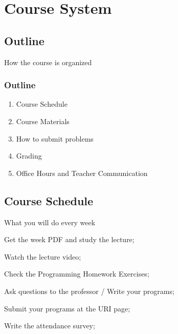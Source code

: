 
\section{Course System}
\subsection{Outline}

\begin{frame}
  \centering
  {\huge
    How the course is organized
  }
\end{frame}

\begin{frame}
  \frametitle{Outline}
  \begin{enumerate}
    \item Course Schedule
    \item Course Materials
    \item How to submit problems
    \item Grading
    \item Office Hours and Teacher Communication
  \end{enumerate}
\end{frame}

\subsection{Course Schedule}
\begin{frame}{What you will do every week}
  \begin{description}[(manaba)]
    \item[(manaba)] Get the week PDF and study the lecture;
    \medskip
    \item[(manaba)] Watch the lecture video;
    \medskip
    \item[(kattis)] Check the Programming Homework Exercises;
    \medskip
    \item[(TEAMS/3C205)] Ask questions to the professor / Write your programs;
    \medskip
    \item[(kattis)] Submit your programs at the URI page;
    \medskip
    \item[(manaba)] Write the attendance survey;
  \end{description}
\end{frame}

